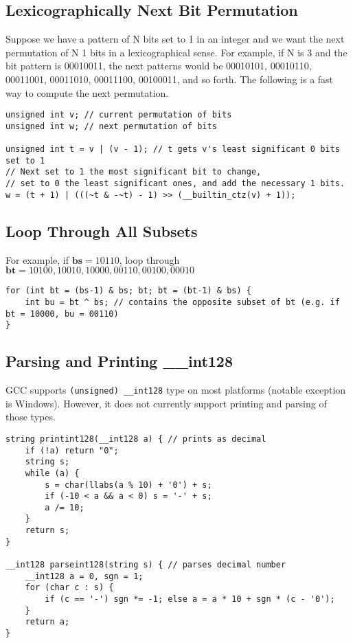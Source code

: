 \documentclass[letterpaper]{article}
\begin{document}
\subsection{Lexicographically Next Bit Permutation}
Suppose we have a pattern of N bits set to 1 in an integer and we want the next permutation of N 1 bits in a lexicographical sense. For example, if N is 3 and the bit pattern is 00010011, the next patterns would be 00010101, 00010110, 00011001, 00011010, 00011100, 00100011, and so forth. The following is a fast way to compute the next permutation.

\begin{lstlisting}
unsigned int v; // current permutation of bits
unsigned int w; // next permutation of bits

unsigned int t = v | (v - 1); // t gets v's least significant 0 bits set to 1
// Next set to 1 the most significant bit to change,
// set to 0 the least significant ones, and add the necessary 1 bits.
w = (t + 1) | (((~t & -~t) - 1) >> (__builtin_ctz(v) + 1));
\end{lstlisting}

\subsection{Loop Through All Subsets}
For example, if $\mathbf{bs} = 10110$, loop through $\mathbf{bt} = 10100, 10010, 10000, 00110, 00100, 00010$

\begin{lstlisting}
for (int bt = (bs-1) & bs; bt; bt = (bt-1) & bs) {
	int bu = bt ^ bs; // contains the opposite subset of bt (e.g. if bt = 10000, bu = 00110)
}
\end{lstlisting}

\subsection{Parsing and Printing \_\_int128}
GCC supports \texttt{(unsigned) \_\_int128} type on most platforms (notable exception is Windows). However, it does not currently support printing and parsing of those types.

\begin{lstlisting}
string printint128(__int128 a) { // prints as decimal
	if (!a) return "0";
	string s;
	while (a) {
		s = char(llabs(a % 10) + '0') + s;
		if (-10 < a && a < 0) s = '-' + s;
		a /= 10;
	}
	return s;
}

__int128 parseint128(string s) { // parses decimal number
	__int128 a = 0, sgn = 1;
	for (char c : s) {
		if (c == '-') sgn *= -1; else a = a * 10 + sgn * (c - '0');
	}
	return a;
}
\end{lstlisting}
\end{document}
